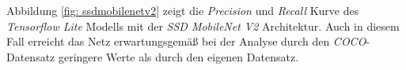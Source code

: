 

Abbildung \ref{fig: ssdmobilenetv2} zeigt die \textit{Precision} und \textit{Recall} Kurve des \textit{Tensorflow Lite} Modells mit der \textit{SSD MobileNet V2} Architektur. Auch in diesem Fall erreicht das Netz erwartungsgemäß bei der Analyse durch den \textit{COCO}-Datensatz geringere Werte als durch den eigenen Datensatz.    







